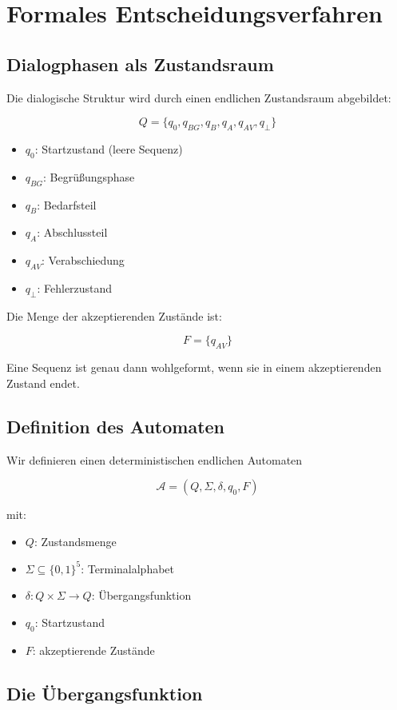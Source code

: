 \documentclass[
  12pt,
  a4paper,
  oneside,
  titlepage
]{article}
\begin{document}
\section{Formales Entscheidungsverfahren}

\subsection{Dialogphasen als Zustandsraum}

Die dialogische Struktur wird durch einen endlichen Zustandsraum 
abgebildet:

\[
Q = \{q_0, q_{BG}, q_B, q_A, q_{AV}, q_\bot\}
\]

\begin{itemize}
    \item \(q_0\): Startzustand (leere Sequenz)
    \item \(q_{BG}\): Begrüßungsphase
    \item \(q_B\): Bedarfsteil
    \item \(q_A\): Abschlussteil
    \item \(q_{AV}\): Verabschiedung
    \item \(q_\bot\): Fehlerzustand
\end{itemize}

Die Menge der akzeptierenden Zustände ist:

\[
F = \{q_{AV}\}
\]

Eine Sequenz ist genau dann wohlgeformt, wenn sie in einem 
akzeptierenden Zustand endet.

\subsection{Definition des Automaten}

Wir definieren einen deterministischen endlichen Automaten

\[
\mathcal{A} = (Q, \Sigma, \delta, q_0, F)
\]

mit:
\begin{itemize}
    \item \(Q\): Zustandsmenge
    \item \(\Sigma \subseteq \{0,1\}^5\): Terminalalphabet
    \item \(\delta: Q \times \Sigma \to Q\): Übergangsfunktion
    \item \(q_0\): Startzustand
    \item \(F\): akzeptierende Zustände
\end{itemize}

\subsection{Die Übergangsfunktion}
\end{document}
